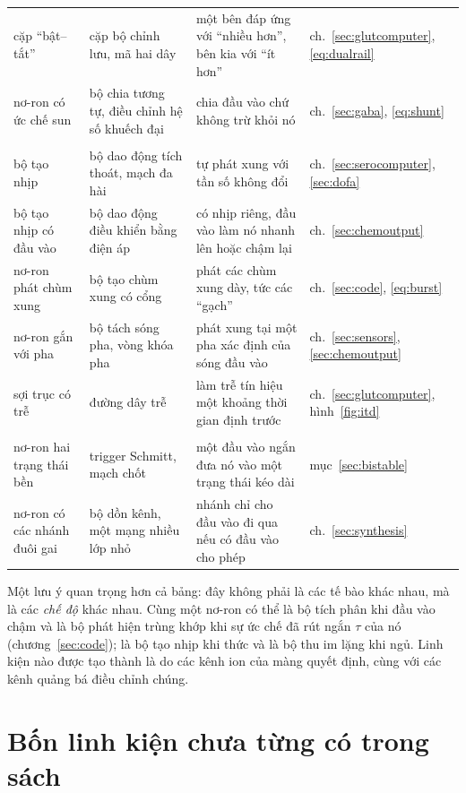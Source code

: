 \begin{center}
\begin{longtable}{>{\raggedright}p{3.1cm}>{\raggedright}p{3.3cm}>{\raggedright}p{4.7cm}>{\raggedright\arraybackslash}p{2.4cm}}
cặp ``bật--tắt'' & cặp bộ chỉnh lưu, mã hai dây & một bên đáp ứng với ``nhiều hơn'', bên kia với ``ít hơn'' & ch.~\ref{sec:glutcomputer}, \eqref{eq:dualrail} \\
nơ-ron có ức chế sun & bộ chia tương tự, điều chỉnh hệ số khuếch đại & chia đầu vào chứ không trừ khỏi nó & ch.~\ref{sec:gaba}, \eqref{eq:shunt} \\
\midrule
\multicolumn{4}{l}{\emph{Bộ tạo dao động và thời gian}} \\
bộ tạo nhịp & bộ dao động tích thoát, mạch đa hài & tự phát xung với tần số không đổi & ch.~\ref{sec:serocomputer}, \ref{sec:dofa} \\
bộ tạo nhịp có đầu vào & bộ dao động điều khiển bằng điện áp & có nhịp riêng, đầu vào làm nó nhanh lên hoặc chậm lại & ch.~\ref{sec:chemoutput} \\
nơ-ron phát chùm xung & bộ tạo chùm xung có cổng & phát các chùm xung dày, tức các ``gạch'' & ch.~\ref{sec:code}, \eqref{eq:burst} \\
nơ-ron gắn với pha & bộ tách sóng pha, vòng khóa pha & phát xung tại một pha xác định của sóng đầu vào & ch.~\ref{sec:sensors}, \ref{sec:chemoutput} \\
sợi trục có trễ & đường dây trễ & làm trễ tín hiệu một khoảng thời gian định trước & ch.~\ref{sec:glutcomputer}, hình~\ref{fig:itd} \\
\midrule
\multicolumn{4}{l}{\emph{Bộ nhớ và chuyển mạch}} \\
nơ-ron hai trạng thái bền & trigger Schmitt, mạch chốt & một đầu vào ngắn đưa nó vào một trạng thái kéo dài & mục~\ref{sec:bistable} \\
nơ-ron có các nhánh đuôi gai & bộ dồn kênh, một mạng nhiều lớp nhỏ & nhánh chỉ cho đầu vào đi qua nếu có đầu vào cho phép & ch.~\ref{sec:synthesis} \\
\end{longtable}
\end{center}

Một lưu ý quan trọng hơn cả bảng: đây không phải là các tế bào khác nhau, mà là các \emph{chế độ} khác nhau. Cùng một nơ-ron có thể là bộ tích phân khi đầu vào chậm và là bộ phát hiện trùng khớp khi sự ức chế đã rút ngắn $\tau$ của nó (chương~\ref{sec:code}); là bộ tạo nhịp khi thức và là bộ thu im lặng khi ngủ. Linh kiện nào được tạo thành là do các kênh ion của màng quyết định, cùng với các kênh quảng bá điều chỉnh chúng.

\section{Bốn linh kiện chưa từng có trong sách}

